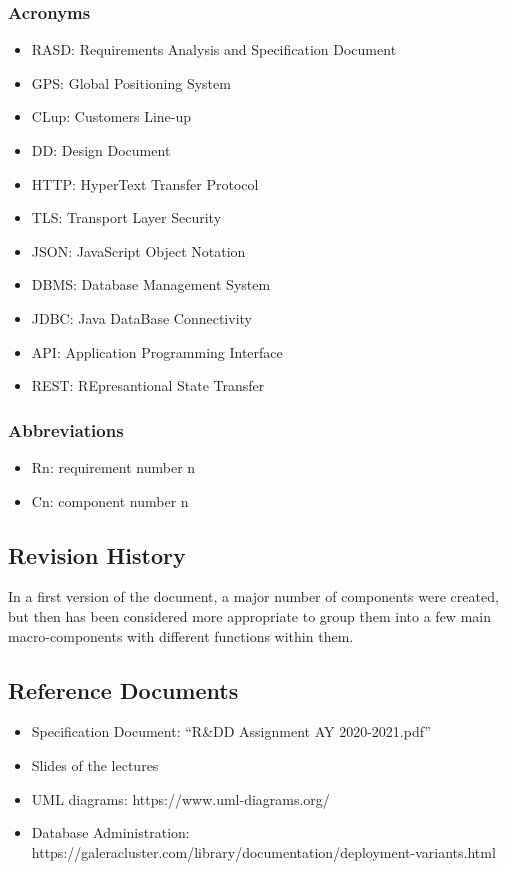 		\subsubsection{Acronyms}
		\begin{itemize}
			\item \textcolor{BrickRed}{RASD}: Requirements Analysis and Specification Document 
			\item \textcolor{BrickRed}{GPS}: Global Positioning System
			\item \textcolor{BrickRed}{CLup}: Customers Line-up
			\item \textcolor{BrickRed}{DD}: Design Document 
			\item \textcolor{BrickRed}{HTTP}: HyperText Transfer Protocol
			\item \textcolor{BrickRed}{TLS}: Transport Layer Security
			\item \textcolor{BrickRed}{JSON}: JavaScript Object Notation
			\item \textcolor{BrickRed}{DBMS}: Database Management System
			\item \textcolor{BrickRed}{JDBC}: Java DataBase Connectivity
			\item \textcolor{BrickRed}{API}: Application Programming Interface
			\item \textcolor{BrickRed}{REST}: REpresantional State Transfer
		\end{itemize}
		
		\subsubsection{Abbreviations}
		\begin{itemize}
			\item \textcolor{BrickRed}{Rn}: requirement number n
			\item \textcolor{BrickRed}{Cn}: component number n
		\end{itemize}
		
	\subsection{Revision History}
	In a first version of the document, a major number of components were created, but then has been considered more appropriate to group them into a few main macro-components with different functions within them.
	
	\subsection{Reference Documents}
	\begin{itemize}
			\item \textcolor{BrickRed}{Specification Document}: “R\&DD Assignment AY 2020-2021.pdf”
			\item \textcolor{BrickRed}{Slides of the lectures}
			\item \textcolor{BrickRed}{UML diagrams}: https://www.uml-diagrams.org/
			\item \textcolor{BrickRed}{Database Administration}: https://galeracluster.com/library/documentation/deployment-variants.html
	\end{itemize}
		

